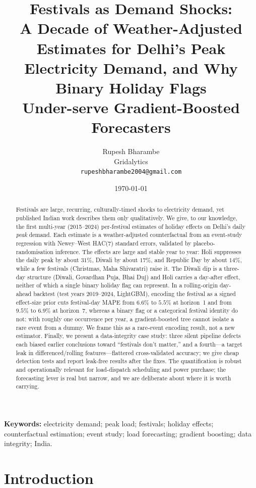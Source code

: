 \documentclass[11pt]{article}
\title{\textbf{Festivals as Demand Shocks:\\[2pt]
A Decade of Weather-Adjusted Estimates for Delhi's Peak\\
Electricity Demand, and Why Binary Holiday Flags\\
Under-serve Gradient-Boosted Forecasters}}
\author{Rupesh Bharambe\\
  \small Gridalytics\\
  \small \texttt{rupeshbharambe2004@gmail.com}}
\date{\today}
\newcommand{\pct}{\%}
\begin{document}
\maketitle

\begin{abstract}
\noindent
Festivals are large, recurring, culturally-timed shocks to electricity demand,
yet published Indian work describes them only qualitatively. We give, to our
knowledge, the first multi-year (2015--2024) per-festival estimates of holiday
effects on Delhi's daily \emph{peak} demand. Each estimate is a weather-adjusted
counterfactual from an event-study regression with Newey--West HAC(7) standard
errors, validated by placebo-randomisation inference. The effects are large and
stable year to year: Holi suppresses the daily peak by about $31\pct$, Diwali by
about $17\pct$, and Republic Day by about $14\pct$, while a few festivals
(Christmas, Maha Shivaratri) raise it. The Diwali dip is a three-day structure
(Diwali, Govardhan Puja, Bhai Duj) and Holi carries a day-after effect, neither
of which a single binary holiday flag can represent. In a rolling-origin
day-ahead backtest (test years 2019--2024, LightGBM), encoding the festival as a
signed effect-size prior cuts festival-day MAPE from $6.6\pct$ to $5.5\pct$ at
horizon~1 and from $9.5\pct$ to $6.9\pct$ at horizon~7, whereas a binary flag or
a categorical festival identity do not: with roughly one occurrence per year, a
gradient-boosted tree cannot isolate a rare event from a dummy. We frame this as
a rare-event encoding result, not a new estimator. Finally, we present a
data-integrity case study: three silent pipeline defects each biased earlier
conclusions toward ``festivals don't matter,'' and a fourth---a target leak in
differenced/rolling features---flattered cross-validated accuracy; we give cheap
detection tests and report leak-free results after the fixes. The quantification
is robust and operationally relevant for load-dispatch scheduling and power
purchase; the forecasting lever is real but narrow, and we are deliberate about
where it is worth carrying.
\end{abstract}

\vspace{0.5em}
\noindent\textbf{Keywords:} electricity demand; peak load; festivals; holiday
effects; counterfactual estimation; event study; load forecasting; gradient
boosting; data integrity; India.

\section{Introduction}
\label{sec:intro}
\end{document}
